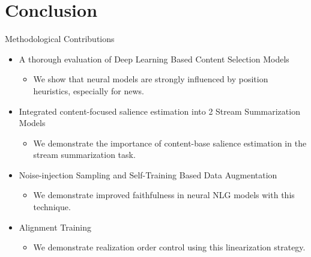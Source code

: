 \section{Conclusion}


\begin{frame}{Methodological Contributions}
    \begin{itemize}
        \item <1-> A thorough evaluation of Deep Learning Based Content Selection 
            Models
            \begin{itemize}
                \item We show that neural models are strongly influenced by  position heuristics, especially for news.
            \end{itemize}
        \vspace{5pt}
        \item<2-> Integrated content-focused salience estimation into 2 Stream Summarization Models
            \begin{itemize}
                \item We demonstrate the importance of content-base salience
                    estimation in the stream summarization task.

            \end{itemize}
        \vspace{5pt}
        \item<3-> Noise-injection Sampling and Self-Training Based Data Augmentation
        \begin{itemize}
            \item We demonstrate improved faithfulness in neural NLG models with
                this technique.
        \end{itemize}
        \vspace{5pt}
        \item<4-> Alignment Training 
        \begin{itemize}
            \item We demonstrate realization order control using this linearization strategy.
        \end{itemize}
    \end{itemize}
\end{frame}

